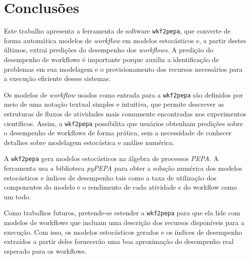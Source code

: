 \documentclass[a4paper,10pt]{article}
\begin{document}
    \newpage
    \section*{Conclusões}

	Este trabalho apresenta a ferramenta de software \texttt{wkf2pepa}, que converte de forma autom\'atica modelos de \emph{workflow} em modelos estocásticos e, a partir destes \'ultimos, extrai predições do desempenho dos \emph{workflows}. A predição do desempenho de workflows é importante porque auxilia a identificação de problemas em sua modelagem e o provisionamento dos recursos necessários para a execução eficiente desses sistemas.

    Os modelos de \emph{workflow} usados como entrada para a \texttt{wkf2pepa} são definidos por meio de uma notaç\~ao textual simples e intuitiva, que permite descrever as estruturas de fluxos de atividades mais comumente encontradas nos experimentos cient\'ificos. Assim, a \texttt{wkf2pepa} possibilita que usuários obtenham predições sobre o desempenho de workflows de forma prática, sem a necessidade de conhecer detalhes sobre modelagem estocástica e análise numérica.

    A \texttt{wkf2pepa} gera modelos estocásticos na álgebra de processos \emph{PEPA}. A ferramenta usa a biblioteca \emph{pyPEPA} para obter a solução numérica dos modelos estocásticos e índices de desempenho tais como a taxa de utilização dos componentes do modelo e o rendimento de cada atividade e do workflow como um todo.

	Como trabalhos futuros, pretende-se estender a \texttt{wkf2pepa} para que ela lide com modelos de workflows que incluam uma descrição dos recursos disponíveis para a execução. Com isso, os modelos estocásticos gerados e os índices de desempenho extraídos a partir deles fornecerão uma boa aproximação do desempenho real esperado para os workflows.


    
    
\end{document}
